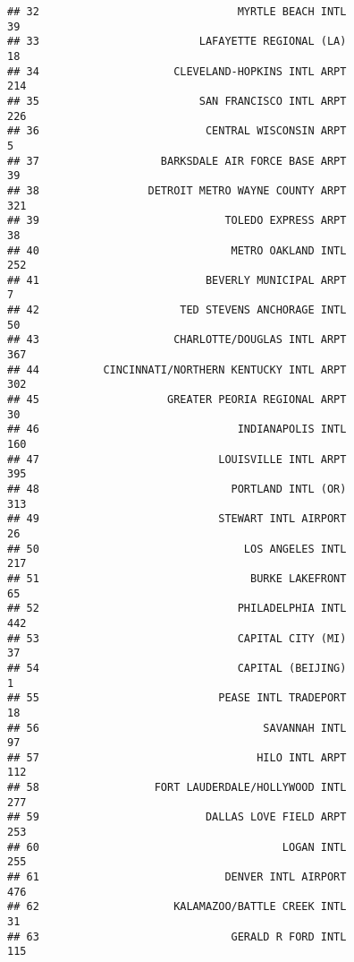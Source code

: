 \documentclass[
]{article}
\begin{document}
\begin{verbatim}
## 32                               MYRTLE BEACH INTL                          39
## 33                         LAFAYETTE REGIONAL (LA)                          18
## 34                     CLEVELAND-HOPKINS INTL ARPT                         214
## 35                         SAN FRANCISCO INTL ARPT                         226
## 36                          CENTRAL WISCONSIN ARPT                           5
## 37                   BARKSDALE AIR FORCE BASE ARPT                          39
## 38                 DETROIT METRO WAYNE COUNTY ARPT                         321
## 39                             TOLEDO EXPRESS ARPT                          38
## 40                              METRO OAKLAND INTL                         252
## 41                          BEVERLY MUNICIPAL ARPT                           7
## 42                      TED STEVENS ANCHORAGE INTL                          50
## 43                     CHARLOTTE/DOUGLAS INTL ARPT                         367
## 44          CINCINNATI/NORTHERN KENTUCKY INTL ARPT                         302
## 45                    GREATER PEORIA REGIONAL ARPT                          30
## 46                               INDIANAPOLIS INTL                         160
## 47                            LOUISVILLE INTL ARPT                         395
## 48                              PORTLAND INTL (OR)                         313
## 49                            STEWART INTL AIRPORT                          26
## 50                                LOS ANGELES INTL                         217
## 51                                 BURKE LAKEFRONT                          65
## 52                               PHILADELPHIA INTL                         442
## 53                               CAPITAL CITY (MI)                          37
## 54                               CAPITAL (BEIJING)                           1
## 55                            PEASE INTL TRADEPORT                          18
## 56                                   SAVANNAH INTL                          97
## 57                                  HILO INTL ARPT                         112
## 58                  FORT LAUDERDALE/HOLLYWOOD INTL                         277
## 59                          DALLAS LOVE FIELD ARPT                         253
## 60                                      LOGAN INTL                         255
## 61                             DENVER INTL AIRPORT                         476
## 62                     KALAMAZOO/BATTLE CREEK INTL                          31
## 63                              GERALD R FORD INTL                         115

\end{verbatim}
\end{document}
